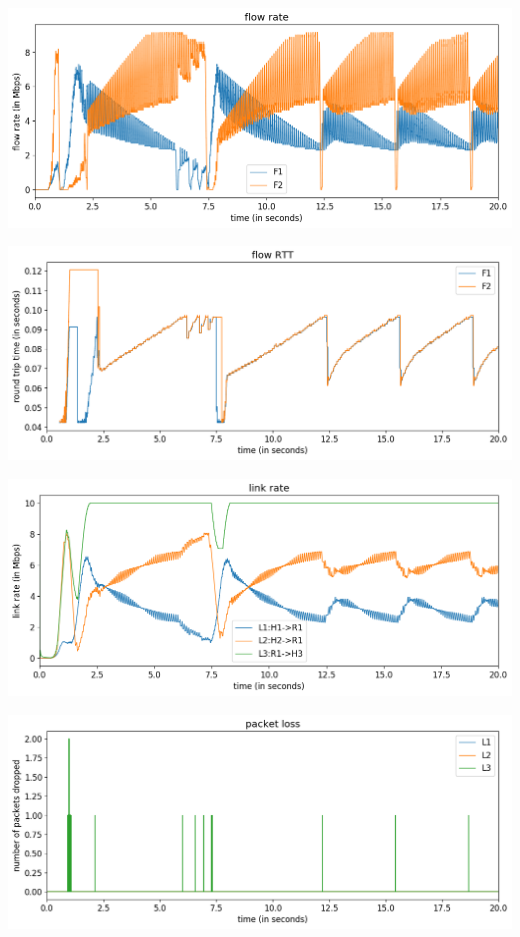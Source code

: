 \documentclass{article}
\begin{document}
\includegraphics[width = \textwidth]{"test_case_custom flow rate"}

\includegraphics[width = \textwidth]{"test_case_custom flow RTT"}

\includegraphics[width = \textwidth]{"test_case_custom link rate"}

\includegraphics[width = \textwidth]{"test_case_custom packet loss"}
\end{document}
